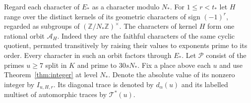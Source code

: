 \documentclass[a4paper,11pt]{article}
\theoremstyle{definition}
\theoremstyle{remark}
\newcommand{\ZZ}{\mathbb Z}\newcommand{\ord}{\operatorname{ord}}
\numberwithin{equation}{section}
\begin{document}
Regard each character of $E_*$ as a character modulo $N_*$.
For $1\le r<t_*$ let $H$ range over the distinct kernels of
its geometric characters of sign $(-1)^r$, regarded as subgroups
of $(\ZZ/N_*\ZZ)^\times$. The characters of kernel $H$ form
one rational orbit $\mathcal A_H$. Indeed they are the faithful
characters of the same cyclic quotient, permuted transitively by
raising their values to exponents prime to its order.
Every character in such an orbit factors through $E_*$.
Let $\mathcal P$ consist of the primes $u\ge7$ split in $K$
and prime to $30sN_*$. Fix a place above each $u$ and use
Theorem~\ref{thm:integer} at level $N_*$. Denote the absolute
value of its nonzero integer by $I_{u,H,r}$. Its diagonal
trace is denoted by $d_\alpha(u)$ and its labelled multiset of
automorphic traces by $\mathcal T^*(u)$.
\end{document}
